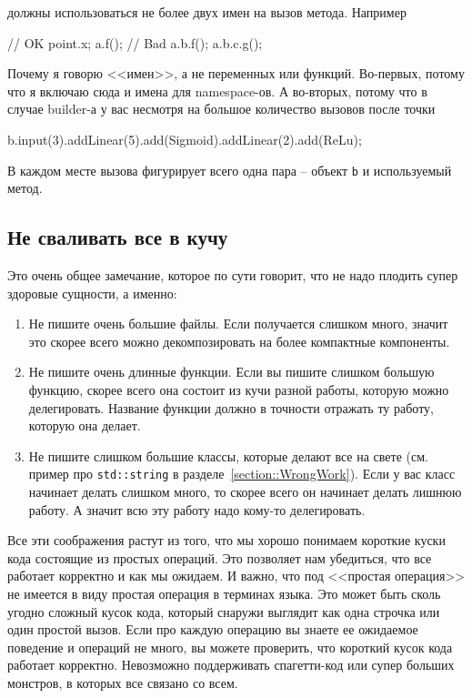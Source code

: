 должны использоваться не более двух имен на вызов метода.
Например
\begin{cppcode}
// OK
point.x;
a.f();
// Bad
a.b.f();
a.b.c.g();
\end{cppcode}
Почему я говорю <<имен>>, а не переменных или функций.
Во-первых, потому что я включаю сюда и имена для namespace-ов.
А во-вторых, потому что в случае builder-а у вас несмотря на большое количество вызовов после точки
\begin{cppcode}
b.input(3).addLinear(5).add(Sigmoid).addLinear(2).add(ReLu);
\end{cppcode}
В каждом месте вызова фигурирует всего одна пара -- объект \verb"b" и используемый метод.

\subsection{Не сваливать все в кучу}
\label{section::SeparateStuff}

Это очень общее замечание, которое по сути говорит, что не надо плодить супер здоровые сущности, а именно:
\begin{enumerate}
\item Не пишите очень большие файлы.
Если получается слишком много, значит это скорее всего можно декомпозировать на более компактные компоненты.

\item Не пишите очень длинные функции.
Если вы пишите слишком большую функцию, скорее всего она состоит из кучи разной работы, которую можно делегировать.
Название функции должно в точности отражать ту работу, которую она делает.

\item Не пишите слишком большие классы, которые делают все на свете (см. пример про \verb"std::string" в разделе~\ref{section::WrongWork}).
Если у вас класс начинает делать слишком много, то скорее всего он начинает делать лишнюю работу.
А значит всю эту работу надо кому-то делегировать.
\end{enumerate}
Все эти соображения растут из того, что мы хорошо понимаем короткие куски кода состоящие из простых операций.
Это позволяет нам убедиться, что все работает корректно и как мы ожидаем.
И важно, что под <<простая операция>> не имеется в виду простая операция в терминах языка.
Это может быть сколь угодно сложный кусок кода, который снаружи выглядит как одна строчка или один простой вызов.
Если про каждую операцию вы знаете ее ожидаемое поведение и операций не много, вы можете проверить, что короткий кусок кода работает корректно.
Невозможно поддерживать спагетти-код или супер больших монстров, в которых все связано со всем.

